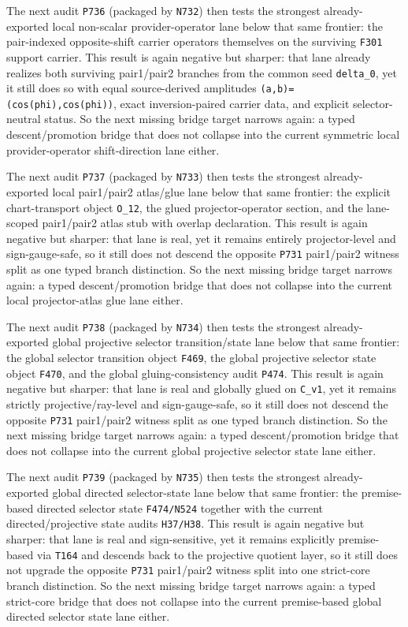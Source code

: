 \documentclass[11pt,a4paper]{article}
\begin{document}
The next audit \texttt{P736} (packaged by \texttt{N732}) then tests the strongest already-exported local non-scalar provider-operator lane
below that same frontier: the pair-indexed opposite-shift carrier operators themselves on the surviving \texttt{F301} support carrier.
This result is again negative but sharper:
that lane already realizes both surviving pair1/pair2 branches from the common seed \texttt{delta\_0},
yet it still does so with equal source-derived amplitudes \texttt{(a,b)=(cos(phi),cos(phi))},
exact inversion-paired carrier data, and explicit selector-neutral status.
So the next missing bridge target narrows again:
a typed descent/promotion bridge that does not collapse into the current symmetric local provider-operator shift-direction lane either.

The next audit \texttt{P737} (packaged by \texttt{N733}) then tests the strongest already-exported local pair1/pair2 atlas/glue lane
below that same frontier: the explicit chart-transport object \texttt{O\_12}, the glued projector-operator section,
and the lane-scoped pair1/pair2 atlas stub with overlap declaration.
This result is again negative but sharper:
that lane is real, yet it remains entirely projector-level and sign-gauge-safe,
so it still does not descend the opposite \texttt{P731} pair1/pair2 witness split as one typed branch distinction.
So the next missing bridge target narrows again:
a typed descent/promotion bridge that does not collapse into the current local projector-atlas glue lane either.

The next audit \texttt{P738} (packaged by \texttt{N734}) then tests the strongest already-exported global projective selector transition/state lane
below that same frontier: the global selector transition object \texttt{F469}, the global projective selector state object \texttt{F470},
and the global gluing-consistency audit \texttt{P474}.
This result is again negative but sharper:
that lane is real and globally glued on \texttt{C\_v1}, yet it remains strictly projective/ray-level and sign-gauge-safe,
so it still does not descend the opposite \texttt{P731} pair1/pair2 witness split as one typed branch distinction.
So the next missing bridge target narrows again:
a typed descent/promotion bridge that does not collapse into the current global projective selector state lane either.

The next audit \texttt{P739} (packaged by \texttt{N735}) then tests the strongest already-exported global directed selector-state lane
below that same frontier: the premise-based directed selector state \texttt{F474/N524} together with the current directed/projective state audits \texttt{H37/H38}.
This result is again negative but sharper:
that lane is real and sign-sensitive, yet it remains explicitly premise-based via \texttt{T164} and descends back to the projective quotient layer,
so it still does not upgrade the opposite \texttt{P731} pair1/pair2 witness split into one strict-core branch distinction.
So the next missing bridge target narrows again:
a typed strict-core bridge that does not collapse into the current premise-based global directed selector state lane either.
\end{document}
